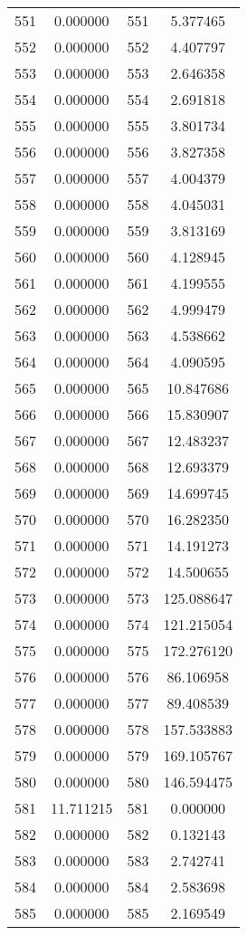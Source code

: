 \documentclass[12pt]{article}
\begin{document}
\begin{longtable}{@{}cccc@{}}
551 & 0.000000 & 551 & 5.377465 \\
552 & 0.000000 & 552 & 4.407797 \\
553 & 0.000000 & 553 & 2.646358 \\
554 & 0.000000 & 554 & 2.691818 \\
555 & 0.000000 & 555 & 3.801734 \\
556 & 0.000000 & 556 & 3.827358 \\
557 & 0.000000 & 557 & 4.004379 \\
558 & 0.000000 & 558 & 4.045031 \\
559 & 0.000000 & 559 & 3.813169 \\
560 & 0.000000 & 560 & 4.128945 \\
561 & 0.000000 & 561 & 4.199555 \\
562 & 0.000000 & 562 & 4.999479 \\
563 & 0.000000 & 563 & 4.538662 \\
564 & 0.000000 & 564 & 4.090595 \\
565 & 0.000000 & 565 & 10.847686 \\
566 & 0.000000 & 566 & 15.830907 \\
567 & 0.000000 & 567 & 12.483237 \\
568 & 0.000000 & 568 & 12.693379 \\
569 & 0.000000 & 569 & 14.699745 \\
570 & 0.000000 & 570 & 16.282350 \\
571 & 0.000000 & 571 & 14.191273 \\
572 & 0.000000 & 572 & 14.500655 \\
573 & 0.000000 & 573 & 125.088647 \\
574 & 0.000000 & 574 & 121.215054 \\
575 & 0.000000 & 575 & 172.276120 \\
576 & 0.000000 & 576 & 86.106958 \\
577 & 0.000000 & 577 & 89.408539 \\
578 & 0.000000 & 578 & 157.533883 \\
579 & 0.000000 & 579 & 169.105767 \\
580 & 0.000000 & 580 & 146.594475 \\
581 & 11.711215 & 581 & 0.000000 \\
582 & 0.000000 & 582 & 0.132143 \\
583 & 0.000000 & 583 & 2.742741 \\
584 & 0.000000 & 584 & 2.583698 \\
585 & 0.000000 & 585 & 2.169549 \\

\end{longtable}
\end{document}
